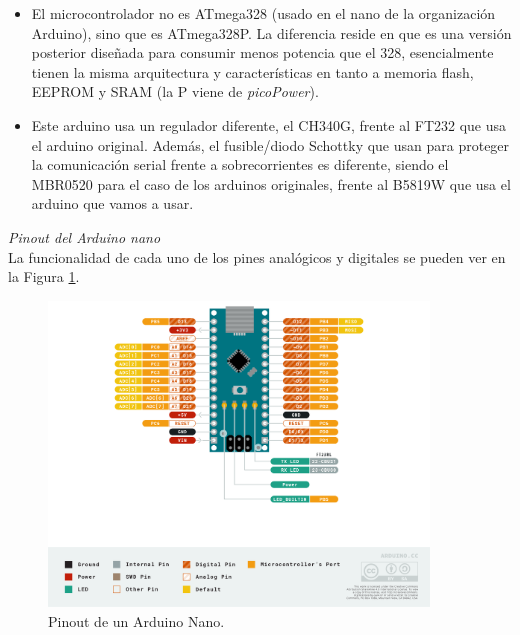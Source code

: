 \documentclass[12pt]{article}
\begin{document}
	\begin{itemize}
		\item El microcontrolador no es ATmega328 (usado en el nano de la organización Arduino), sino que es ATmega328P. La diferencia reside en que es una versión posterior diseñada para consumir menos potencia que el 328, esencialmente tienen la misma arquitectura y características en tanto a memoria flash, EEPROM y SRAM (la P viene de \textit{picoPower}).
		\item Este arduino usa un regulador diferente, el CH340G, frente al FT232 que usa el arduino original. Además, el fusible/diodo Schottky que usan para proteger la comunicación serial frente a sobrecorrientes es diferente, siendo el MBR0520 para el caso de los arduinos originales, frente al B5819W que usa el arduino que vamos a usar.
	\end{itemize}

	\noindent \textit{Pinout del Arduino nano} \\
	
	\noindent La funcionalidad de cada uno de los pines analógicos y digitales se pueden ver en la Figura \ref{Pinout Arduino nano}. \\
	
	\begin{figure}[h!]
		\begin{center}
			\includegraphics[width=0.9\textwidth]{img/Pinout-NANO_official.png}
			\caption{Pinout de un Arduino Nano.}
			\label{Pinout Arduino nano}
		\end{center}
	\end{figure}

	\pagebreak
	
\end{document}
